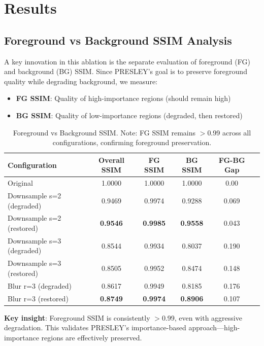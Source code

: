 \documentclass[11pt,a4paper]{article}
\begin{document}
\section{Results}

\subsection{Foreground vs Background SSIM Analysis}

A key innovation in this ablation is the separate evaluation of foreground (FG) and background (BG) SSIM. Since PRESLEY's goal is to preserve foreground quality while degrading background, we measure:
\begin{itemize}
    \item \textbf{FG SSIM}: Quality of high-importance regions (should remain high)
    \item \textbf{BG SSIM}: Quality of low-importance regions (degraded, then restored)
\end{itemize}

\begin{table}[h]
\centering
\begin{tabular}{lccccc}
\toprule
\textbf{Configuration} & \textbf{Overall SSIM} & \textbf{FG SSIM} & \textbf{BG SSIM} & \textbf{FG-BG Gap} \\
\midrule
Original & 1.0000 & 1.0000 & 1.0000 & 0.00 \\
\midrule
Downsample s=2 (degraded) & 0.9469 & 0.9974 & 0.9288 & 0.069 \\
Downsample s=2 (restored) & \textbf{0.9546} & \textbf{0.9985} & \textbf{0.9558} & 0.043 \\
\midrule
Downsample s=3 (degraded) & 0.8544 & 0.9934 & 0.8037 & 0.190 \\
Downsample s=3 (restored) & 0.8505 & 0.9952 & 0.8474 & 0.148 \\
\midrule
Blur r=3 (degraded) & 0.8617 & 0.9949 & 0.8185 & 0.176 \\
Blur r=3 (restored) & \textbf{0.8749} & \textbf{0.9974} & \textbf{0.8906} & 0.107 \\
\bottomrule
\end{tabular}
\caption{Foreground vs Background SSIM. Note: FG SSIM remains $>$0.99 across all configurations, confirming foreground preservation.}
\label{tab:fgbg}
\end{table}

\textbf{Key insight}: Foreground SSIM is consistently $>$0.99, even with aggressive degradation. This validates PRESLEY's importance-based approach---high-importance regions are effectively preserved.
\end{document}

